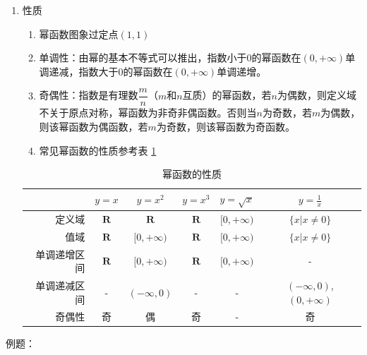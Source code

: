 \begin{enumerate}
    \item 性质
        \begin{enumerate}
            \item 幂函数图象过定点$(1, 1)$
            \item 单调性：由幂的基本不等式可以推出，指数小于$0$的幂函数在$(0, +\infty)$单调递减，指数大于$0$的幂函数在$(0, +\infty)$单调递增。
            \item 奇偶性：指数是有理数$\dfrac{m}{n}$（$m$和$n$互质）的幂函数，若$n$为偶数，则定义域不关于原点对称，幂函数为非奇非偶函数。否则当$n$为奇数，若$m$为偶数，则该幂函数为偶函数，若$m$为奇数，则该幂函数为奇函数。
            \item 常见幂函数的性质参考表 \ref{tab:power_function}
        \end{enumerate}
        \begin{table}[h]
            \centering
            \begin{tabular}{r|ccccc}
                 \hline
                 &$y=x$ & $y=x^2$ & $y=x^3$ & $y=\sqrt{x}$ & $y = \frac{1}{x}$ \\
                 \hline
                 定义域 & $\mathbf{R}$ & $\mathbf{R}$ & $\mathbf{R}$ & $[0, +\infty)$ & $\{x|x \neq 0\}$ \\
                 值域& $\mathbf{R}$ & $[0, +\infty)$ & $\mathbf{R}$ & $[0, +\infty)$ & $\{x|x \neq 0\}$ \\
                 单调递增区间& $\mathbf{R}$ & $[0, +\infty)$ & $\mathbf{R}$  & $[0, +\infty)$ & - \\
                 单调递减区间& - & $(-\infty, 0)$ & - & - & $(-\infty, 0)$, $(0, +\infty)$\\
                 奇偶性& 奇 & 偶 & 奇 & - & 奇\\
                 \hline
            \end{tabular}
            \caption{幂函数的性质}
            \label{tab:power_function}
        \end{table}
\end{enumerate}
例题：
